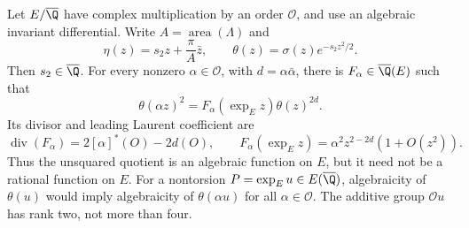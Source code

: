 \begin{statement}
Let $E/\overline{\Q}$ have complex multiplication by an order
$\mathcal O$, and use an algebraic invariant differential. Write
$A=\operatorname{area}(\Lambda)$ and
\[
 \eta(z)=s_2z+\frac{\pi}{A}\bar z,\qquad
 \theta(z)=\sigma(z)e^{-s_2z^2/2}.
\]
Then $s_2\in\overline{\Q}$. For every nonzero
$\alpha\in\mathcal O$, with $d=\alpha\bar\alpha$, there is
$F_\alpha\in\overline{\Q}(E)$ such that
\begin{equation}\label{eq:ct-CMmult}
 \theta(\alpha z)^2=F_\alpha(\exp_E z)\theta(z)^{2d}.
\end{equation}
Its divisor and leading Laurent coefficient are
\[
 \operatorname{div}(F_\alpha)=2[\alpha]^*(O)-2d(O),\qquad
 F_\alpha(\exp_Ez)=\alpha^2z^{2-2d}(1+O(z^2)).
\]
Thus the unsquared quotient is an algebraic function on $E$, but
it need not be a rational function on $E$. For a nontorsion
$P=\exp_Eu\in E(\overline{\Q})$, algebraicity of $\theta(u)$
would imply algebraicity of $\theta(\alpha u)$ for all
$\alpha\in\mathcal O$. The additive group $\mathcal O u$ has
rank two, not more than four.
\end{statement}
